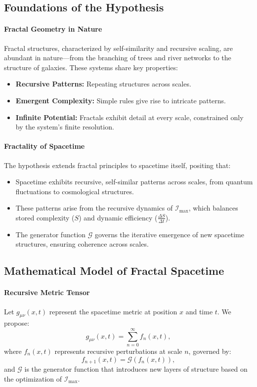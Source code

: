 \documentclass[12pt]{article}
\begin{document}
\subsection{Foundations of the Hypothesis}

\paragraph{Fractal Geometry in Nature}
Fractal structures, characterized by self-similarity and recursive scaling, are abundant in nature—from the branching of trees and river networks to the structure of galaxies. These systems share key properties:
\begin{itemize}
    \item \textbf{Recursive Patterns:} Repeating structures across scales.
    \item \textbf{Emergent Complexity:} Simple rules give rise to intricate patterns.
    \item \textbf{Infinite Potential:} Fractals exhibit detail at every scale, constrained only by the system’s finite resolution.
\end{itemize}

\paragraph{Fractality of Spacetime}
The hypothesis extends fractal principles to spacetime itself, positing that:
\begin{itemize}
    \item Spacetime exhibits recursive, self-similar patterns across scales, from quantum fluctuations to cosmological structures.
    \item These patterns arise from the recursive dynamics of \(\mathcal{I}_{\text{max}}\), which balances stored complexity (\(S\)) and dynamic efficiency (\(\frac{\Delta S}{\Delta t}\)).
    \item The generator function \(\mathcal{G}\) governs the iterative emergence of new spacetime structures, ensuring coherence across scales.
\end{itemize}

\subsection{Mathematical Model of Fractal Spacetime}

\paragraph{Recursive Metric Tensor}
Let \(g_{\mu\nu}(x, t)\) represent the spacetime metric at position \(x\) and time \(t\). We propose:
\[
g_{\mu\nu}(x, t) = \sum_{n=0}^\infty f_n(x, t),
\]
where \(f_n(x, t)\) represents recursive perturbations at scale \(n\), governed by:
\[
f_{n+1}(x, t) = \mathcal{G}(f_n(x, t)),
\]
and \(\mathcal{G}\) is the generator function that introduces new layers of structure based on the optimization of \(\mathcal{I}_{\text{max}}\).
\end{document}
